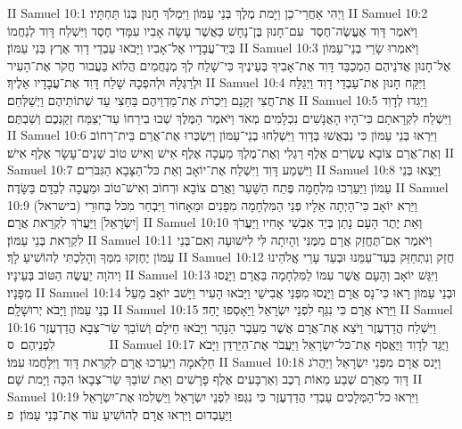 II Samuel 10:1	וַיְהִי אַחֲרֵי־כֵן וַיָּמת מֶלֶךְ בְּנֵי עַמּוֹן וַיִּמְלֹךְ חָנוּן בְּנוֹ תַּחְתָּיו׃
II Samuel 10:2	וַיֹּאמֶר דָּוִד אֶעֱשֶׂה־חֶסֶד  עִם־חָנוּן בֶּן־נָחָשׁ כַּאֲשֶׁר עָשָׂה אָבִיו עִמָּדִי חֶסֶד וַיִּשְׁלַח דָּוִד לְנַחֲמוֹ בְּיַד־עֲבָדָיו אֶל־אָבִיו וַיָּבֹאוּ עַבְדֵי דָוִד אֶרֶץ בְּנֵי עַמּוֹן׃
II Samuel 10:3	וַיֹּאמְרוּ שָׂרֵי בְנֵי־עַמּוֹן אֶל־חָנוּן אֲדֹנֵיהֶם הַמְכַבֵּד דָּוִד אֶת־אָבִיךָ בְּעֵינֶיךָ כִּי־שָׁלַח לְךָ מְנַחֲמִים הֲלוֹא בַּעֲבוּר חֲקֹר אֶת־הָעִיר וּלְרַגְּלָהּ וּלְהפְכָהּ שָׁלַח דָּוִד אֶת־עֲבָדָיו אֵלֶיךָ׃
II Samuel 10:4	וַיִּקַּח חָנוּן אֶת־עַבְדֵי דָוִד וַיְגַלַּח אֶת־חֲצִי זְקָנָם וַיִּכְרֹת אֶת־מַדְוֵיהֶם בַּחֵצִי עַד שְׁתוֹתֵיהֶם וַיְשַׁלְּחֵם׃
II Samuel 10:5	וַיַּגִּדוּ לְדָוִד וַיִּשְׁלַח לִקְרָאתָם כִּי־הָיוּ הָאֲנָשִׁים נִכְלָמִים מְאֹד וַיֹּאמֶר הַמֶּלֶךְ שְׁבוּ בִירֵחוֹ עַד־יְצַמַּח זְקַנְכֶם וְשַׁבְתֶּם׃
II Samuel 10:6	וַיִּרְאוּ בְּנֵי עַמּוֹן כִּי נִבְאֲשׁוּ בְּדָוִד וַיִּשְׁלְחוּ בְנֵי־עַמּוֹן וַיִּשְׂכְּרוּ אֶת־אֲרַם בֵּית־רְחוֹב וְאֶת־אֲרַם צוֹבָא עֶשְׂרִים אֶלֶף רַגְלִי וְאֶת־מֶלֶךְ מַעֲכָה אֶלֶף אִישׁ וְאִישׁ טוֹב שְׁנֵים־עָשָׂר אֶלֶף אִישׁ׃
II Samuel 10:7	וַיִּשְׁמַע דָּוִד וַיִּשְׁלַח אֶת־יוֹאָב וְאֵת כּל־הַצָּבָא הַגִּבֹּרִים׃
II Samuel 10:8	וַיֵּצְאוּ בְּנֵי עַמּוֹן וַיַּעַרְכוּ מִלְחָמָה פֶּתַח הַשָּׁעַר וַאֲרַם צוֹבָא וּרְחוֹב וְאִישׁ־טוֹב וּמַעֲכָה לְבַדָּם בַּשָּׂדֶה׃
II Samuel 10:9	וַיַּרְא יוֹאָב כִּי־הָיְתָה אֵלָיו פְּנֵי הַמִּלְחָמָה מִפָּנִים וּמֵאָחוֹר וַיִּבְחַר מִכֹּל בְּחוּרֵי (בישראל) [יִשְׂרָאֵל] וַיַּעֲרֹךְ לִקְרַאת אֲרָם׃
II Samuel 10:10	וְאֵת יֶתֶר הָעָם נָתַן בְּיַד אַבְשַׁי אָחִיו וַיַּעֲרֹךְ לִקְרַאת בְּנֵי עַמּוֹן׃
II Samuel 10:11	וַיֹּאמֶר אִם־תֶּחֱזַק אֲרָם מִמֶּנִּי וְהָיִתָה לִּי לִישׁוּעָה וְאִם־בְּנֵי עַמּוֹן יֶחֶזְקוּ מִמְּךָ וְהָלַכְתִּי לְהוֹשִׁיעַ לָךְ׃
II Samuel 10:12	חֲזַק וְנִתְחַזַּק בְּעַד־עַמֵּנוּ וּבְעַד עָרֵי אֱלֹהֵינוּ וַיהֹוָה יַעֲשֶׂה הַטּוֹב בְּעֵינָיו׃
II Samuel 10:13	וַיִּגַּשׁ יוֹאָב וְהָעָם אֲשֶׁר עִמּוֹ לַמִּלְחָמָה בַּאֲרָם וַיָּנֻסוּ מִפָּנָיו׃
II Samuel 10:14	וּבְנֵי עַמּוֹן רָאוּ כִּי־נָס אֲרָם וַיָּנֻסוּ מִפְּנֵי אֲבִישַׁי וַיָּבֹאוּ הָעִיר וַיָּשׁב יוֹאָב מֵעַל בְּנֵי עַמּוֹן וַיָּבֹא יְרוּשָׁלָ͏ִם׃
II Samuel 10:15	וַיַּרְא אֲרָם כִּי נִגַּף לִפְנֵי יִשְׂרָאֵל וַיֵּאָסְפוּ יָחַד׃
II Samuel 10:16	וַיִּשְׁלַח הֲדַדְעֶזֶר וַיֹּצֵא אֶת־אֲרָם אֲשֶׁר מֵעֵבֶר הַנָּהָר וַיָּבֹאוּ חֵילָם וְשׁוֹבַךְ שַׂר־צְבָא הֲדַדְעֶזֶר לִפְנֵיהֶם׃ {ס}        
II Samuel 10:17	וַיֻּגַּד לְדָוִד וַיֶּאֱסֹף אֶת־כּל־יִשְׂרָאֵל וַיַּעֲבֹר אֶת־הַיַּרְדֵּן וַיָּבֹא חֵלָאמָה וַיַּעַרְכוּ אֲרָם לִקְרַאת דָּוִד וַיִּלָּחֲמוּ עִמּוֹ׃
II Samuel 10:18	וַיָּנס אֲרָם מִפְּנֵי יִשְׂרָאֵל וַיַּהֲרֹג דָּוִד מֵאֲרָם שְׁבַע מֵאוֹת רֶכֶב וְאַרְבָּעִים אֶלֶף פָּרָשִׁים וְאֵת שׁוֹבַךְ שַׂר־צְבָאוֹ הִכָּה וַיָּמת שָׁם׃
II Samuel 10:19	וַיִּרְאוּ כל־הַמְּלָכִים עַבְדֵי הֲדַדְעֶזֶר כִּי נִגְּפוּ לִפְנֵי יִשְׂרָאֵל וַיַּשְׁלִמוּ אֶת־יִשְׂרָאֵל וַיַּעַבְדוּם וַיִּרְאוּ אֲרָם לְהוֹשִׁיעַ עוֹד אֶת־בְּנֵי עַמּוֹן׃ {פ}
